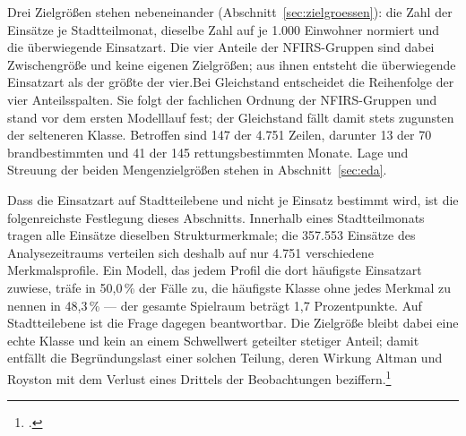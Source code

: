 \documentclass[12pt,a4paper]{article}
\begin{document}
Drei Zielgrößen stehen nebeneinander (Abschnitt~\ref{sec:zielgroessen}): die
Zahl der Einsätze je Stadtteilmonat, dieselbe Zahl auf je 1.000 Einwohner
normiert und die überwiegende Einsatzart. Die vier Anteile der NFIRS-Gruppen
sind dabei Zwischengröße und keine eigenen Zielgrößen; aus ihnen entsteht die
überwiegende Einsatzart als der größte der vier.Bei Gleichstand entscheidet die Reihenfolge der vier Anteilsspalten. Sie folgt der fachlichen Ordnung der NFIRS-Gruppen und stand vor dem ersten Modelllauf fest; der Gleichstand fällt damit stets zugunsten der selteneren Klasse. Betroffen sind 147 der 4.751 Zeilen, darunter 13 der 70 brandbestimmten und 41 der 145 rettungsbestimmten Monate. Lage und Streuung der beiden
Mengenzielgrößen stehen in Abschnitt~\ref{sec:eda}.
 
Dass die Einsatzart auf Stadtteilebene und nicht je Einsatz bestimmt wird, ist
die folgenreichste Festlegung dieses Abschnitts. Innerhalb eines
Stadtteilmonats tragen alle Einsätze dieselben Strukturmerkmale; die 357.553
Einsätze des Analysezeitraums verteilen sich deshalb auf nur 4.751 verschiedene
Merkmalsprofile. Ein Modell, das jedem Profil die dort häufigste Einsatzart
zuwiese, träfe in 50,0\,\% der Fälle zu, die häufigste Klasse ohne jedes
Merkmal zu nennen in 48,3\,\% --- der gesamte Spielraum beträgt 1,7
Prozentpunkte. Auf Stadtteilebene ist die Frage dagegen beantwortbar. Die
Zielgröße bleibt dabei eine echte Klasse und kein an einem Schwellwert
geteilter stetiger Anteil; damit entfällt die Begründungslast einer solchen
Teilung, deren Wirkung Altman und Royston mit dem Verlust eines Drittels der
Beobachtungen beziffern.\footcite{Altman2006}
 
\end{document}
